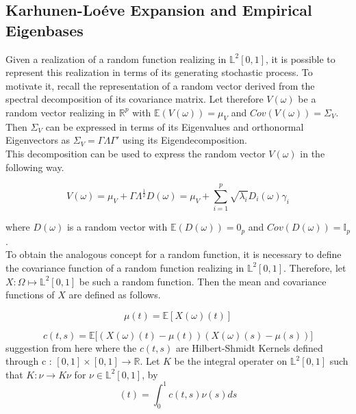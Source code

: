 \documentclass[11pt,twoside,a4paper]{article}
\begin{document}
	\subsection{Karhunen-Lo\'{e}ve Expansion and Empirical Eigenbases}\hypertarget{KL}{}
	Given a realization of a random function realizing in $\mathbb{L}^2[0,1]$, it is possible to represent this realization in terms of its generating stochastic process. To motivate it, recall the representation of a random vector derived from the spectral decomposition of its covariance matrix. Let therefore $V(\omega)$ be a random vector realizing in $\mathbb{R}^{p}$ with $\mathbb{E}(V(\omega)) = \mu_V$ and $Cov(V(\omega)) = \Sigma_V$. Then $\Sigma_V$ can be expressed in terms of its Eigenvalues and orthonormal Eigenvectors as $\Sigma_V = \Gamma \Lambda \Gamma'$ using its Eigendecomposition.\\
		
	This decomposition can be used to express the random vector $V(\omega)$ in the following way.
	
	\begin{equation}
		V(\omega) = \mu_V + \Gamma \Lambda^{\frac{1}{2}} D(\omega) = \mu_V + \sum_{i = 1}^{p} \sqrt{\lambda_i} D_i(\omega) \gamma_i
	\end{equation}
	
	where $D(\omega)$ is a random vector with $\mathbb{E}(D(\omega)) = 0_p$ and $Cov(D(\omega)) = \mathbb{I}_p$.\\
	
	To obtain the analogous concept for a random function, it is necessary to define the covariance function of a random function realizing in $\mathbb{L}^2[0,1]$. Therefore, let $X: \Omega \mapsto \mathbb{L}^2[0,1]$ be such a random function.
	Then the mean and covariance functions of $X$ are defined as follows.
	
	\begin{equation}\label{MeanFunction}
		\mu(t) = \mathbb{E}\left[ X(\omega)(t) \right]
	\end{equation}
	
	\begin{equation}\label{CovarianceFunction}
		c(t,s) = \mathbb{E}\big[ \left( X(\omega)(t) - \mu(t) \right) \left( X(\omega)(s) - \mu(s) \right) \big]
	\end{equation}
	{\color{orange}suggestion from here}
	where the $c(t,s)$ are Hilbert-Shmidt Kernels defined through c : $[0,1] \times [0,1] \rightarrow \mathbb{R}$. Let $K$ be the integral operater on $\mathbb{L}^{2}[0,1]$ such that $K : \nu \rightarrow K \nu$ for $\nu \in \mathbb{L}^{2}[0,1]$, by
	\begin{equation}
		[K \nu](t) = \int_{0}^{1}c(t,s) \nu(s)ds
	\end{equation}
\end{document}
